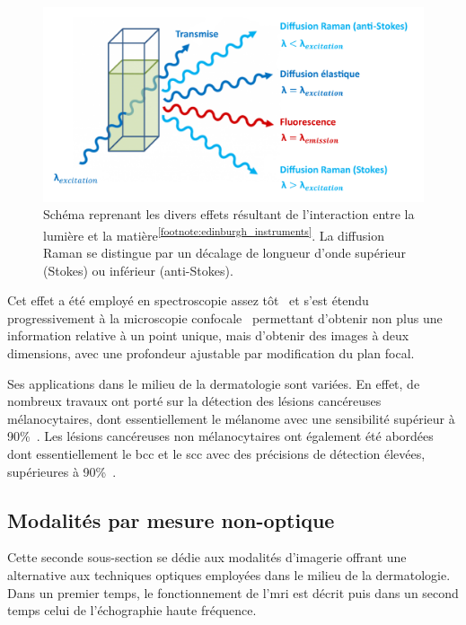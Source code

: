 \begin{figure}[H]
    \centering
    \includegraphics[width=\linewidth]{contents/chapter_2/resources/scheme_principle_raman.pdf}
    \caption{Schéma reprenant les divers effets résultant de l'interaction entre la lumière et la matière\textsuperscript{\ref{footnote:edinburgh_instruments}}. La diffusion Raman se distingue par un décalage de longueur d'onde supérieur (Stokes) ou inférieur (anti-Stokes).}
    \label{fig:scheme_principle_raman}
\end{figure}\par

\addtocounter{footnote}{1}

Cet effet a été employé en spectroscopie assez tôt~\cite{Ferraro2003,Ferraro2003b} et s'est étendu progressivement à la microscopie confocale~\cite{Casper2003} permettant d'obtenir non plus une information relative à un point unique, mais d'obtenir des images à deux dimensions, avec une profondeur ajustable par modification du plan focal.\par

Ses applications dans le milieu de la dermatologie sont variées. En effet, de nombreux travaux ont porté sur la détection des lésions cancéreuses mélanocytaires, dont essentiellement le mélanome avec une sensibilité supérieur à 90\%~\cite{Lui2012,Schleusener2015}. Les lésions cancéreuses non mélanocytaires ont également été abordées dont essentiellement le \gls{bcc} et le \gls{scc} avec des précisions de détection élevées, supérieures à 90\%~\cite{Lieber2008,Silveira2015}.\par
\clearpage

\subsection{Modalités par mesure non-optique}
Cette seconde sous-section se dédie aux modalités d'imagerie offrant une alternative aux techniques optiques employées dans le milieu de la dermatologie. Dans un premier temps, le fonctionnement de l'\gls{mri} est décrit puis dans un second temps celui de l'échographie haute fréquence.\par

